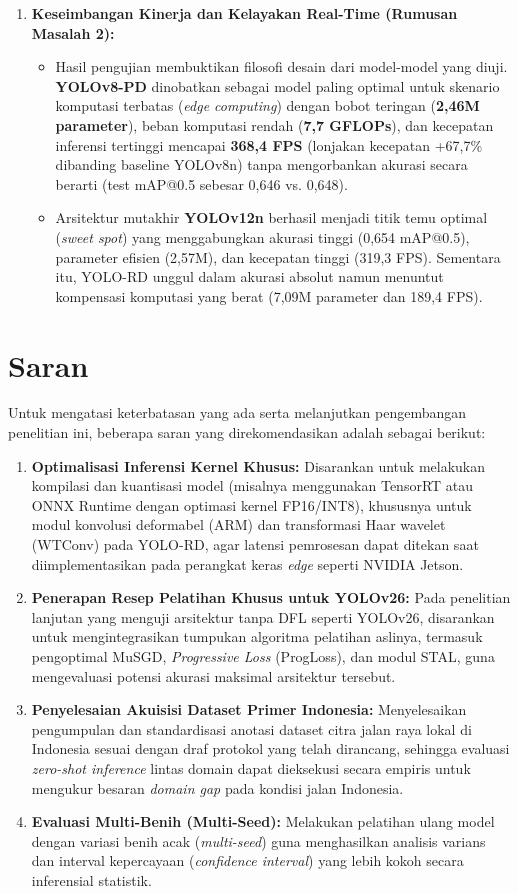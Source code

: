 \begin{enumerate}
	\item \textbf{Keseimbangan Kinerja dan Kelayakan Real-Time (Rumusan Masalah 2):}
	\begin{itemize}
		\item Hasil pengujian membuktikan filosofi desain dari model-model yang diuji. \textbf{YOLOv8-PD} dinobatkan sebagai model paling optimal untuk skenario komputasi terbatas (\textit{edge computing}) dengan bobot teringan (\textbf{2,46M parameter}), beban komputasi rendah (\textbf{7,7 GFLOPs}), dan kecepatan inferensi tertinggi mencapai \textbf{368,4 FPS} (lonjakan kecepatan +67,7\% dibanding baseline YOLOv8n) tanpa mengorbankan akurasi secara berarti (test mAP@0.5 sebesar 0,646 vs. 0,648).
		\item Arsitektur mutakhir \textbf{YOLOv12n} berhasil menjadi titik temu optimal (\textit{sweet spot}) yang menggabungkan akurasi tinggi (0,654 mAP@0.5), parameter efisien (2,57M), dan kecepatan tinggi (319,3 FPS). Sementara itu, YOLO-RD unggul dalam akurasi absolut namun menuntut kompensasi komputasi yang berat (7,09M parameter dan 189,4 FPS).
	\end{itemize}
\end{enumerate}

\section{Saran}
\label{sec:saran}

Untuk mengatasi keterbatasan yang ada serta melanjutkan pengembangan penelitian ini, beberapa saran yang direkomendasikan adalah sebagai berikut:
\begin{enumerate}
	\item \textbf{Optimalisasi Inferensi Kernel Khusus:} Disarankan untuk melakukan kompilasi dan kuantisasi model (misalnya menggunakan TensorRT atau ONNX Runtime dengan optimasi kernel FP16/INT8), khususnya untuk modul konvolusi deformabel (ARM) dan transformasi Haar wavelet (WTConv) pada YOLO-RD, agar latensi pemrosesan dapat ditekan saat diimplementasikan pada perangkat keras \textit{edge} seperti NVIDIA Jetson.
	\item \textbf{Penerapan Resep Pelatihan Khusus untuk YOLOv26:} Pada penelitian lanjutan yang menguji arsitektur tanpa DFL seperti YOLOv26, disarankan untuk mengintegrasikan tumpukan algoritma pelatihan aslinya, termasuk pengoptimal MuSGD, \textit{Progressive Loss} (ProgLoss), dan modul STAL, guna mengevaluasi potensi akurasi maksimal arsitektur tersebut.
	\item \textbf{Penyelesaian Akuisisi Dataset Primer Indonesia:} Menyelesaikan pengumpulan dan standardisasi anotasi dataset citra jalan raya lokal di Indonesia sesuai dengan draf protokol yang telah dirancang, sehingga evaluasi \textit{zero-shot inference} lintas domain dapat dieksekusi secara empiris untuk mengukur besaran \textit{domain gap} pada kondisi jalan Indonesia.
	\item \textbf{Evaluasi Multi-Benih (Multi-Seed):} Melakukan pelatihan ulang model dengan variasi benih acak (\textit{multi-seed}) guna menghasilkan analisis varians dan interval kepercayaan (\textit{confidence interval}) yang lebih kokoh secara inferensial statistik.
\end{enumerate}
